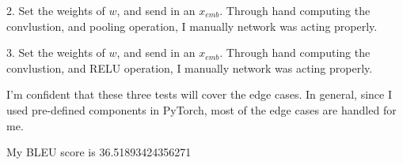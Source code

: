 \documentclass[11pt,largemargins]{homework}
\begin{document}
2. Set the weights of $w$, and send in an $x_{emb}$. Through hand computing the convlustion, and pooling operation, I manually network was acting properly. 

3. Set the weights of $w$, and send in an $x_{emb}$. Through hand computing the convlustion, and RELU operation, I manually network was acting properly. 

I'm confident that these three tests will cover the edge cases. In general, since I used pre-defined components in PyTorch, most of the edge cases are handled for me. 

\question 

My BLEU score is 36.51893424356271

 
 
\end{document}

